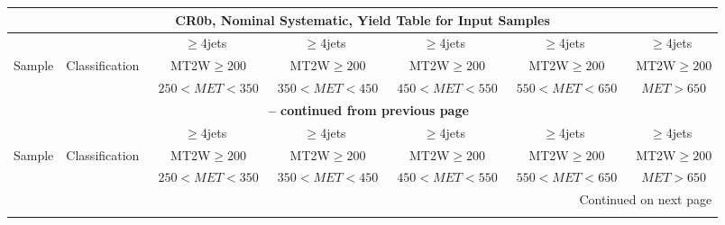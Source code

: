 \documentclass{article}
\begin{document}
\begin{longtable}{|l|c|c|c|c|c|c|} 
 
\multicolumn{7}{c}{ CR0b, Nominal Systematic, Yield Table for Input Samples }\\* \hline 
 &  & $\ge$4jets  & $\ge$4jets  & $\ge$4jets  & $\ge$4jets  & $\ge$4jets \\* 
Sample & Classification  & ~MT2W$\ge200$  & ~MT2W$\ge200$  & ~MT2W$\ge200$  & ~MT2W$\ge200$  & ~MT2W$\ge200$ \\* 
 &  & ~$250<MET<350$  & ~$350<MET<450$  & ~$450<MET<550$  & ~$550<MET<650$  & ~$MET>650$ \\* 
\hline \hline 
\endfirsthead 
 
\multicolumn{7}{c}{{\bfseries \tablename\ \thetable{} -- continued from previous page}}\\* \hline 
 &  & $\ge$4jets  & $\ge$4jets  & $\ge$4jets  & $\ge$4jets  & $\ge$4jets \\* 
Sample & Classification  & ~MT2W$\ge200$  & ~MT2W$\ge200$  & ~MT2W$\ge200$  & ~MT2W$\ge200$  & ~MT2W$\ge200$ \\* 
 &  & ~$250<MET<350$  & ~$350<MET<450$  & ~$450<MET<550$  & ~$550<MET<650$  & ~$MET>650$ \\* 
\hline \hline 
\endhead 
 
\multicolumn{7}{|r|}{{Continued on next page}}\\* \hline 
\endfoot 
 
 
\endlastfoot 
 

\end{longtable}
\end{document}
